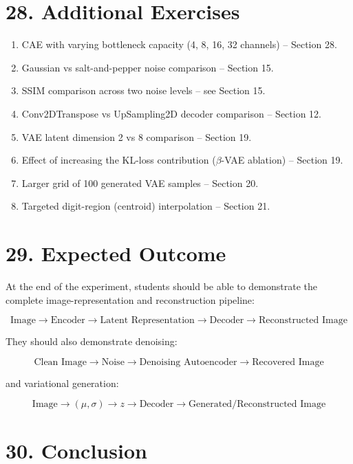 \documentclass[10pt]{article}
\begin{document}
\section*{28. Additional Exercises}

\begin{enumerate}
\item CAE with varying bottleneck capacity (4, 8, 16, 32 channels) -- Section 28.
\item Gaussian vs salt-and-pepper noise comparison -- Section 15.
\item SSIM comparison across two noise levels -- see Section 15.
\item Conv2DTranspose vs UpSampling2D decoder comparison -- Section 12.
\item VAE latent dimension 2 vs 8 comparison -- Section 19.
\item Effect of increasing the KL-loss contribution ($\beta$-VAE ablation) -- Section 19.
\item Larger grid of 100 generated VAE samples -- Section 20.
\item Targeted digit-region (centroid) interpolation -- Section 21.
\end{enumerate}

\section*{29. Expected Outcome}

At the end of the experiment, students should be able to demonstrate the
complete image-representation and reconstruction pipeline:

\[
\boxed{
\text{Image}
\rightarrow
\text{Encoder}
\rightarrow
\text{Latent Representation}
\rightarrow
\text{Decoder}
\rightarrow
\text{Reconstructed Image}
}
\]

They should also demonstrate denoising:

\[
\boxed{
\text{Clean Image}
\rightarrow
\text{Noise}
\rightarrow
\text{Denoising Autoencoder}
\rightarrow
\text{Recovered Image}
}
\]

and variational generation:

\[
\boxed{
\text{Image}
\rightarrow
(\mu,\sigma)
\rightarrow
z
\rightarrow
\text{Decoder}
\rightarrow
\text{Generated/Reconstructed Image}
}
\]


\section*{30. Conclusion}
\end{document}
